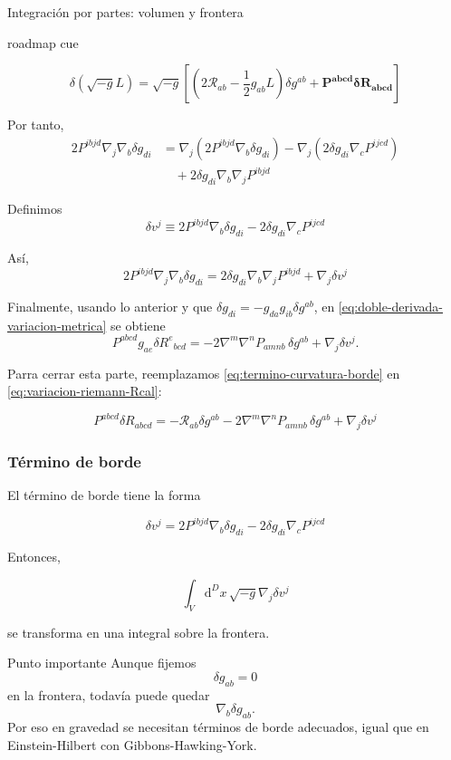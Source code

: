 \documentclass{beamer}
\newcommand{\Rcal}{\mathcal{R}}
\renewcommand{\dd}{\mathrm{d}}
\newcommand{\Eq}[1]{\eqref{#1}}
\newcommand{\CompactDisplaySpacing}{%
  \setlength{\abovedisplayskip}{2pt plus 1pt minus 1pt}%
  \setlength{\belowdisplayskip}{2pt plus 1pt minus 1pt}%
  \setlength{\abovedisplayshortskip}{0pt plus 1pt}%
  \setlength{\belowdisplayshortskip}{1pt plus 1pt}%
}
\newcommand{\RoadmapCue}[1]{%
    \begin{beamercolorbox}[
        wd=\textwidth,
        sep=.55ex,
        leftskip=.8ex,
        rounded=true
    ]{roadmap cue}

    \scriptsize
    \enspace #1

    \end{beamercolorbox}

    \vspace{.25em}
}
\begin{document}
\begin{frame}[label=nav-frame-031]{Integración por partes: volumen y frontera}
\scriptsize
\RoadmapCue{
\[
\delta(\sqrt{-g}L)
=
\sqrt{-g}
\left[
\left(2\Rcal_{ab}-\frac12g_{ab}L\right)\delta g^{ab}
+ \bm{P^{abcd}\delta R_{abcd}}
\right]
\]
}

Por tanto,
\[
\begin{aligned}
2P^{ibjd}\nabla_j\nabla_b\delta g_{di}
&=
\nabla_j
\left(
2P^{ibjd}\nabla_b\delta g_{di}
\right)
-
\nabla_j
\left(
2\delta g_{di}\nabla_cP^{ijcd}
\right)
\\
&\quad
+
2\delta g_{di}\nabla_b\nabla_jP^{ibjd}
\end{aligned}
\]


Definimos
\begin{equation}
\boxed{
\delta v^j
\equiv
2P^{ibjd}\nabla_b\delta g_{di}
-
2\delta g_{di}\nabla_cP^{ijcd}
}
\label{eq:def-delta-v}
\end{equation}

Así,
\[
2P^{ibjd}\nabla_j\nabla_b\delta g_{di}
=
2\delta g_{di}\nabla_b\nabla_jP^{ibjd}
+
\nabla_j\delta v^j
\]


Finalmente, usando lo anterior y que $\delta g_{di}=-g_{da}g_{ib}\delta g^{ab}$, en \Eq{eq:doble-derivada-variacion-metrica} se obtiene
\begin{equation}
\boxed{
P^{abcd}g_{ae}\delta R^{e}{}_{bcd}
=
-2\nabla^m\nabla^nP_{amnb}\,\delta g^{ab}
+
\nabla_j\delta v^j.
}
\label{eq:termino-curvatura-borde}
\end{equation}

Parra cerrar esta parte, reemplazamos \Eq{eq:termino-curvatura-borde} en \Eq{eq:variacion-riemann-Rcal}:

\begin{equation}
\boxed{
P^{abcd}\delta R_{abcd}
=
-\Rcal_{ab}\delta g^{ab}-2\nabla^m\nabla^nP_{amnb}\,\delta g^{ab} + \nabla_j\delta v^j
}
\label{eq:variacion-riemann-completa}
\end{equation}

\end{frame}

\begin{frame}[label=nav-frame-032]
\frametitle{Término de borde}
\small
\CompactDisplaySpacing

El término de borde tiene la forma

\[
\boxed{
\delta v^j
=
2P^{ibjd}\nabla_b\delta g_{di}
-
2\delta g_{di}\nabla_cP^{ijcd}
}
\]

Entonces,

\[
\int_V\dd^Dx\,\sqrt{-g}\nabla_j\delta v^j
\]

se transforma en una integral sobre la frontera.

\begin{alertblock}{Punto importante}
Aunque fijemos
\[
\delta g_{ab}=0
\]
en la frontera, todavía puede quedar
\[
\nabla_b\delta g_{ab}.
\]
Por eso en gravedad se necesitan términos de borde adecuados, igual que en Einstein-Hilbert con Gibbons-Hawking-York.
\end{alertblock}

\end{frame}
\end{document}

